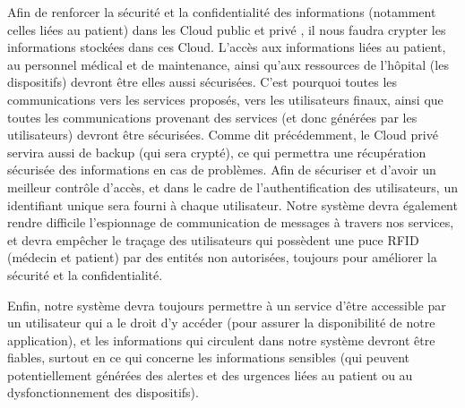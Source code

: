 Afin de renforcer la sécurité et la confidentialité des informations (notamment celles liées au patient) dans les Cloud public et privé \cite{singh2015twenty}, il nous faudra crypter les informations stockées dans ces Cloud. L'accès aux informations liées au patient, au personnel médical et de maintenance, ainsi qu'aux ressources de l'hôpital (les dispositifs) devront être elles aussi sécurisées. C'est pourquoi toutes les communications vers les services proposés, vers les utilisateurs finaux, ainsi que toutes les communications provenant des services (et donc générées par les utilisateurs) devront être sécurisées. Comme dit précédemment, le Cloud privé servira aussi de backup (qui sera crypté), ce qui permettra une récupération sécurisée des informations en cas de problèmes. Afin de sécuriser et d'avoir un meilleur contrôle d'accès, et dans le cadre de l'authentification des utilisateurs, un identifiant unique sera fourni à chaque utilisateur. Notre système devra également rendre difficile l'espionnage de communication de messages à travers nos services, et devra empêcher le traçage des utilisateurs qui possèdent une puce RFID (médecin et patient) par des entités non autorisées, toujours pour améliorer la sécurité et la confidentialité. 

Enfin, notre système devra toujours permettre à un service d'être accessible par un utilisateur qui a le droit d'y accéder (pour assurer la disponibilité de notre application), et les informations qui circulent dans notre système devront être fiables, surtout en ce qui concerne les informations sensibles (qui peuvent potentiellement générées des alertes et des urgences liées au patient ou au dysfonctionnement des dispositifs).
